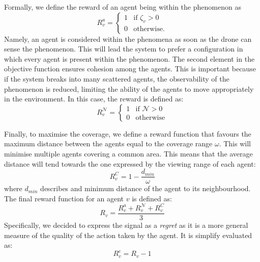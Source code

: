 \documentclass[conference]{IEEEtran}
\begin{document}
Formally, we define the reward of an agent being within the phenomenon as
 \begin{equation*}
 R^a_{v} = \begin{cases}
  1 & \text{if } \zeta_v > 0 \\
  0 & \text{otherwise.} 
 \end{cases}
 \end{equation*}
Namely, an agent is considered within the phenomena as soon as the drone can sense the phenomenon.
%
This will lead the system to prefer a configuration in which every agent is present within the phenomenon.
%
The second element in the objective function ensures cohesion among the agents. 
 This is important because if the system breaks into many scattered agents, 
 the observability of the phenomenon is reduced, 
 limiting the ability of the agents to move appropriately in the environment.
 In this case, the reward is defined as:
 \begin{equation*}
 R^{\mathcal{N}}_{v} = \begin{cases}
  1 & \text{if } \mathcal{N} > 0 \\
  0 & \text{otherwise} 
 \end{cases}
 \end{equation*}
 
Finally, to maximise the coverage, 
  we define a reward function that favours the maximum distance between the agents
  equal to the coverage range $\omega$. This will minimise multiple agents covering a common area.
%
This means that the average distance will tend towards the one expressed by the viewing range of each agent:
% 
\begin{equation*}
R^{C}_{v} = 1 - \frac{d_{min}}{\omega}
\end{equation*}
where $d_{min}$ describes and minimum distance of the agent to its neighbourhood. 
%
The final reward function for an agent $v$ is defined as:
\begin{equation*}
R_{v} = \frac{R^a_{v} + R^{\mathcal{N}}_{v} + R^{C}_{v}}{3}
\end{equation*}
Specifically, we decided to express the signal as a \emph{regret}
  as it is a more general measure of the quality of the action taken by the agent.
It is simplify evaluated as:
\begin{equation*}
R^e_{v} = R_v - 1
\end{equation*}
%
\end{document}
